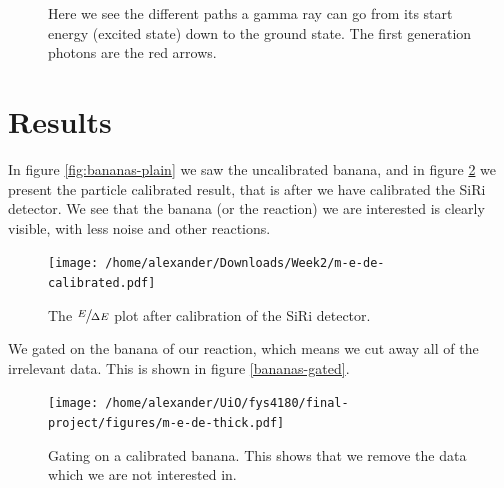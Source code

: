 \documentclass[a4paper,12pt]{article}
\begin{document}
\begin{figure}[H]
    \caption{Here we see the different paths a gamma ray can go from its
        start energy (excited state) down to the ground state. The first
        generation photons are the red arrows.}
    \label{fig:squiggly-states}
\end{figure}

\section{Results}

In figure \ref{fig:bananas-plain} we saw the uncalibrated banana,
and in figure \ref{fig:bananas-plain-calibrated} we present
the particle calibrated result, that is after we have calibrated
the SiRi detector. We see that the banana (or the reaction)
we are interested is clearly visible, with less noise and other reactions.

\begin{figure}[H]
    \centering
    \texttt{[image: /home/alexander/Downloads/Week2/m-e-de-calibrated.pdf]}
    \caption{The $\sfrac{E}{\Delta E}$ plot after calibration of the SiRi detector.}
    \label{fig:bananas-plain-calibrated}
\end{figure}

We gated on the banana of our reaction, which means we cut away
all of the irrelevant data. This
is shown in figure \ref{bananas-gated}.

\begin{figure}[H]
    \centering
    \texttt{[image: /home/alexander/UiO/fys4180/final-project/figures/m-e-de-thick.pdf]}
    \caption{Gating on a calibrated banana. This shows that we remove
    the data which we are not interested in.}
    \label{fig:bananas-gated}
\end{figure}
\end{document}
